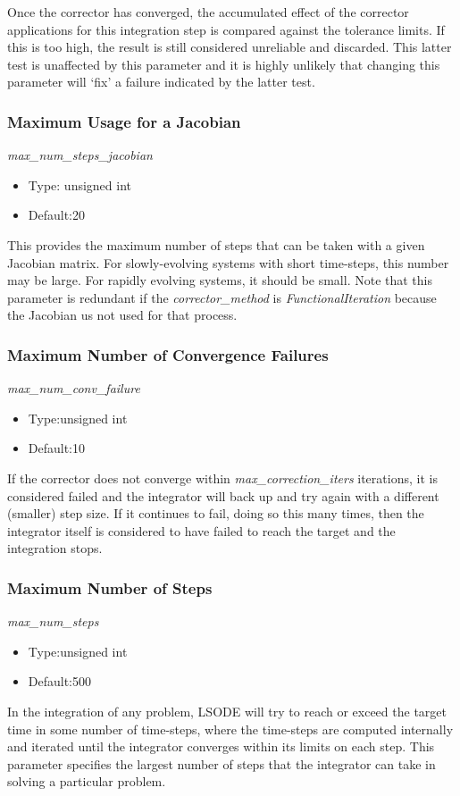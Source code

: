 Once the corrector has converged, the accumulated effect of the corrector
applications for this integration step is compared against the tolerance
limits.  If this is too high, the result is still considered unreliable
and discarded.  This latter test is unaffected by this parameter and it
is highly unlikely that changing this parameter will `fix' a failure indicated
by the latter test.


\subsubsection{Maximum Usage for a Jacobian}
\textit{max\_num\_steps\_jacobian}

\begin{itemize}
\item
Type: unsigned int
\item
Default:20
\end{itemize}
This provides the maximum number of steps that can be taken with a given
Jacobian matrix.  For slowly-evolving systems with short time-steps, this
number may be large.  For rapidly evolving systems, it should be small.
Note that this parameter is redundant if the \textit{corrector\_method} is
\textit{FunctionalIteration}
because the Jacobian us not used for that process.


\subsubsection{Maximum Number of Convergence Failures}
\textit{max\_num\_conv\_failure}

\begin{itemize}
\item
Type:unsigned int
\item
Default:10
\end{itemize}
If the corrector does not converge within \textit{max\_correction\_iters}
iterations,
it is considered failed and the integrator will back up and try again
with a different (smaller) step size.  If it continues to fail, doing
so this many times, then the integrator itself is considered to have failed
to reach the target and the integration stops.

\subsubsection{Maximum Number of Steps}
\textit{max\_num\_steps}

\begin{itemize}
\item
Type:unsigned int
\item
Default:500
\end{itemize}
In the integration of any problem, LSODE will try to reach or exceed the
target time in some number of time-steps, where the time-steps are computed
internally and iterated until the integrator converges within its limits
on each step.  This parameter specifies the largest number of steps that
the integrator can take in solving a particular problem.

